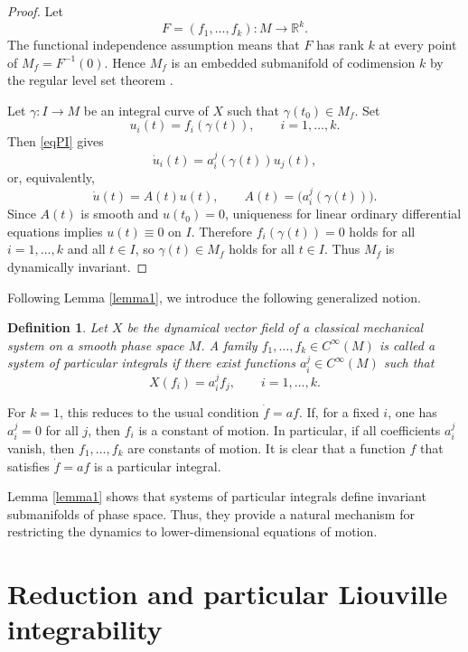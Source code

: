 \documentclass[10pt,a4paper]{article}
\newtheorem{definition}{Definition}
\begin{document}
\begin{proof}
Let
\[
F=(f_1,\ldots,f_k):M\longrightarrow \mathbb{R}^k .
\]
The functional independence assumption means that $F$ has rank $k$ at every point of $M_f=F^{-1}(0)$. Hence $M_f$ is an embedded submanifold of codimension $k$ by the regular level set theorem \cite{Lee2012}.

Let $\gamma:I\to M$ be an integral curve of $X$ such that $\gamma(t_0)\in M_f$. Set
\[
u_i(t)=f_i(\gamma(t)),\qquad i=1,\ldots,k.
\]
Then \eqref{eqPI} gives
\[
\dot u_i(t)=a_i^j(\gamma(t))u_j(t),
\]
or, equivalently,
\[
\dot u(t)=A(t)u(t),\qquad A(t)=\big(a_i^j(\gamma(t))\big).
\]
Since $A(t)$ is smooth and $u(t_0)=0$, uniqueness for linear ordinary differential equations implies $u(t)\equiv 0$ on $I$. Therefore $f_i(\gamma(t))=0$ holds for all $i=1,\ldots,k$ and all $t\in I$, so $\gamma(t)\in M_f$ holds for all $t\in I$. Thus $M_f$ is dynamically invariant.
\end{proof}

Following Lemma \ref{lemma1}, we introduce the following generalized notion.

\begin{definition}
\label{particularintegrals}
Let $X$ be the dynamical vector field of a classical mechanical system on a smooth phase space $M$. A family $f_1,\ldots,f_k\in C^\infty(M)$ is called a system of particular integrals if there exist functions $a_i^j\in C^\infty(M)$ such that
\begin{equation*}
X(f_i)=a_i^j f_j,\qquad i=1,\ldots,k.
\end{equation*}
\end{definition}

For $k=1$, this reduces to the usual condition $\dot f=af$. If, for a fixed $i$, one has $a_i^j=0$ for all $j$, then $f_i$ is a constant of motion. In particular, if all coefficients $a_i^j$ vanish, then $f_1,\ldots,f_k$ are constants of motion.
It is clear that a function $f$ that satisfies $\dot{f}=af$ is a particular integral. 

Lemma \ref{lemma1} shows that systems of particular integrals define invariant submanifolds of phase space. Thus, they provide a natural mechanism for restricting the dynamics to lower-dimensional equations of motion.





\section{Reduction and particular Liouville integrability}
\end{document}
